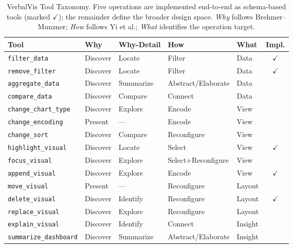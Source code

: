 \documentclass[journal]{IEEEtran}
\begin{document}
\begin{table}[t]
\centering
\caption{VerbalVis Tool Taxonomy. Five operations are implemented end-to-end as schema-based tools (marked $\checkmark$); the remainder define the broader design space. \emph{Why} follows Brehmer--Munzner; \emph{How} follows Yi et al.; \emph{What} identifies the operation target.}
\label{tab:tools}
\small
\begin{tabular}{lllllc}
\toprule
\textbf{Tool} & \textbf{Why} & \textbf{Why-Detail} & \textbf{How} & \textbf{What} & \textbf{Impl.} \\
\midrule
\texttt{filter\_data}          & Discover & Locate     & Filter                 & Data    & $\checkmark$ \\
\texttt{remove\_filter}        & Discover & Locate     & Filter                 & Data    & $\checkmark$ \\
\texttt{aggregate\_data}       & Discover & Summarize  & Abstract/Elaborate     & Data    &              \\
\texttt{compare\_data}         & Discover & Compare    & Connect                & Data    &              \\
\texttt{change\_chart\_type}   & Discover & Explore    & Encode                 & View    &              \\
\texttt{change\_encoding}      & Present  & ---        & Encode                 & View    &              \\
\texttt{change\_sort}          & Discover & Compare    & Reconfigure            & View    &              \\
\texttt{highlight\_visual}     & Discover & Locate     & Select                 & View    & $\checkmark$ \\
\texttt{focus\_visual}         & Discover & Explore    & Select+Reconfigure     & View    &              \\
\texttt{append\_visual}        & Discover & Explore    & Encode                 & View    & $\checkmark$ \\
\texttt{move\_visual}          & Present  & ---        & Reconfigure            & Layout  &              \\
\texttt{delete\_visual}        & Discover & Identify   & Reconfigure            & Layout  & $\checkmark$ \\
\texttt{replace\_visual}       & Discover & Explore    & Reconfigure            & Layout  &              \\
\texttt{explain\_visual}       & Discover & Identify   & Connect                & Insight &              \\
\texttt{summarize\_dashboard}  & Discover & Summarize  & Abstract/Elaborate     & Insight &              \\
\bottomrule
\end{tabular}
\end{table}
\end{document}
